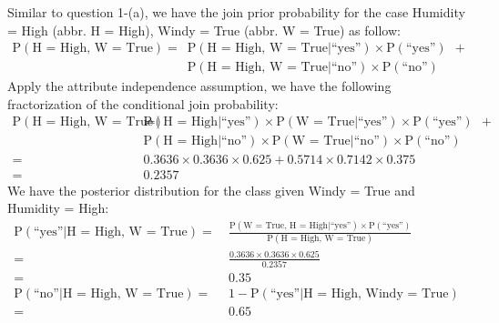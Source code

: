 \documentclass[12pt,twoside]{article}
\begin{document}
\begin{exercises}
\begin{exerciseparts}
  \ifsolution \solution{}
    Similar to question 1-(a), we have the join prior probability
    for the case Humidity = High (abbr. H = High), Windy = True
    (abbr. W = True) as follow:
    \begin{equation*}
      \begin{aligned}
        \mbox{P}(\mbox{H = High, W = True}) 
          = \ & \mbox{P}(\mbox{H = High, W = True}|\mbox{``yes''})  \times \mbox{P}(\mbox{``yes''})\ \ + \\
            & \mbox{P}(\mbox{H = High, W = True}|\mbox{``no''})  \times \mbox{P}(\mbox{``no''})
      \end{aligned}
    \end{equation*}
    Apply the attribute independence assumption, we have the following
    fractorization of the conditional join probability:
    \begin{equation*}
      \begin{aligned}
        \mbox{P}(\mbox{H = High, W = True}) 
          = \ & \mbox{P}(\mbox{H = High}|\mbox{``yes''}) \times 
                \mbox{P}(\mbox{W = True}|\mbox{``yes''}) \times \mbox{P}(\mbox{``yes''})\ \ + \\
              & \mbox{P}(\mbox{H = High}|\mbox{``no''}) \times
                \mbox{P}(\mbox{W = True}|\mbox{``no''}) \times \mbox{P}(\mbox{``no''}) \\
          = \ & 0.3636 \times 0.3636 \times 0.625 + 0.5714 \times 0.7142 \times 0.375 \\
          = \ & 0.2357
      \end{aligned}
    \end{equation*}
    We have the posterior distribution for the class given Windy = True and Humidity = High:
    \begin{equation*}
      \begin{aligned}
        \mbox{P}(\mbox{``yes''} | \mbox{H = High, W = True}) 
        = & \ \frac{\mbox{P}(\mbox{W = True, H = High} | \mbox{``yes''}) \times
        \mbox{P}(\mbox{``yes''})}{\mbox{P}(\mbox{H = High, W = True})} \\
        = & \ \frac{0.3636 \times 0.3636 \times 0.625}{0.2357} \\
        = & \ \boldsymbol{0.35} \\
        \mbox{P}(\mbox{``no''} | \mbox{H = High, W = True}) 
        = & \ 1 - \mbox{P}(\mbox{``yes''} | \mbox{H = High, Windy = True})  \\
        = & \ \boldsymbol{0.65}
      \end{aligned}
    \end{equation*}
  \fi 


\end{exerciseparts}
\end{exercises}
\end{document}
